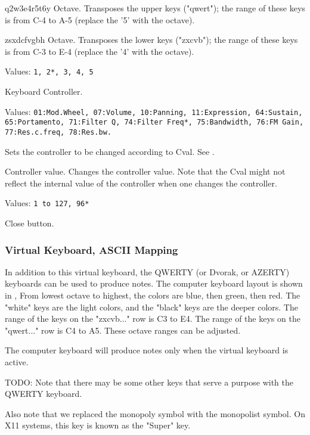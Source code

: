    q2w3e4r5t6y Octave.
   Transposes the upper keys ("qwert"); the range of these keys is from C-4
   to A-5 (replace the '5' with the octave).

   zsxdcfvgbh Octave.
   Transposes the lower keys ("zxcvb"); the range of these keys is from C-3
   to E-4 (replace the '4' with the octave).

   Values: \texttt{1, 2*, 3, 4, 5}

   Keyboard Controller.

   Values: \texttt{01:Mod.Wheel, 07:Volume, 10:Panning,
      11:Expression, 64:Sustain, 65:Portamento, 71:Filter Q,
      74:Filter Freq*, 75:Bandwidth, 76:FM Gain,
      77:Res.c.freq, 78:Res.bw.}

   Sets the controller to be changed according to Cval.
   See .

   Controller value.
   Changes the controller value. Note that the Cval might not reflect the
   internal value of the controller when one changes the controller.

   Values: \texttt{1 to 127, 96*}

   Close button.

\subsubsection{Virtual Keyboard, ASCII Mapping}
\label{subsubsec:virtual_keyboard_ascii}

   In addition to this virtual keyboard, the QWERTY (or Dvorak, or AZERTY)
   keyboards can be used to produce notes.
   The computer keyboard layout is shown in
   ,
   From lowest octave to highest, the colors are blue, then green, then red.
   The "white" keys are the light colors, and the "black" keys are the
   deeper colors.
   The range of the keys on the "zxcvb..." row is C3 to E4.
   The range of the keys on the "qwert..." row is C4 to A5.
   These octave ranges can be adjusted.

   The computer keyboard will produce notes only when the virtual keyboard
   is active.

   TODO: Note that there may be some other keys that serve a purpose with
   the QWERTY keyboard.

   Also note that we replaced the monopoly symbol with the monopolist
   symbol.  On X11 systems, this key is known as the "Super" key.

